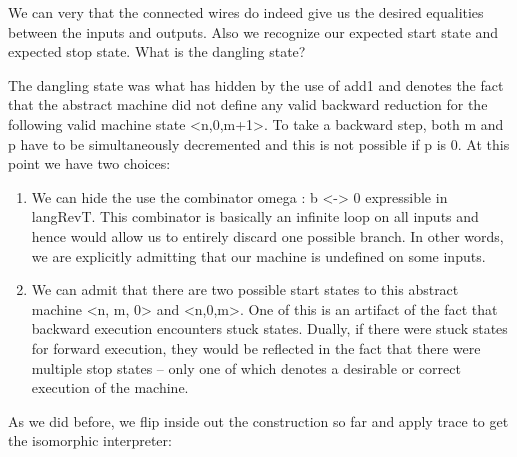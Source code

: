 \documentclass{llncs}
\begin{document}
\begin{center}
\end{center}

We can very that the connected wires do indeed give us the desired
equalities between the inputs and outputs. Also we recognize our
expected start state and expected stop state. What is the dangling
state?

The dangling state was what has hidden by the use of {{add1}} and
denotes the fact that the abstract machine did not define any valid
backward reduction for the following valid machine state
{{<n,0,m+1>}}. To take a backward step, both {{m}} and {{p}} have to
be simultaneously decremented and this is not possible if {{p}} is
{{0}}.  At this point we have two choices:

\begin{enumerate}
\item We can hide the use the combinator {{omega : b <-> 0}}
  expressible in {{langRevT}}. This combinator is basically an
  infinite loop on all inputs and hence would allow us to entirely
  discard one possible branch. In other words, we are explicitly
  admitting that our machine is undefined on some inputs.

\item We can admit that there are two possible start states to this
  abstract machine {{<n, m, 0>}} and {{<n,0,m>}}. One of this is an
  artifact of the fact that backward execution encounters stuck
  states. Dually, if there were stuck states for forward execution,
  they would be reflected in the fact that there were multiple stop
  states -- only one of which denotes a desirable or correct execution
  of the machine.

\end{enumerate}

As we did before, we flip inside out the construction so far and
apply {{trace}} to get the isomorphic interpreter:

\begin{center}
\end{center}
\end{document}
